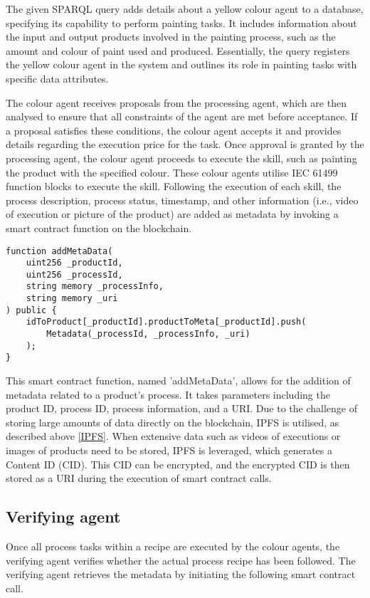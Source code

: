 \documentclass[conference]{IEEEtran}
\begin{document}
The given SPARQL query adds details about a yellow colour agent to a database, specifying its capability to perform painting tasks. It includes information about the input and output products involved in the painting process, such as the amount and colour of paint used and produced. Essentially, the query registers the yellow colour agent in the system and outlines its role in painting tasks with specific data attributes.

The colour agent receives proposals from the processing agent, which are then analysed to ensure that all constraints of the agent are met before acceptance.  If a proposal satisfies these conditions, the colour agent accepts it and provides details regarding the execution price for the task. Once approval is granted by the processing agent, the colour agent proceeds to execute the skill,  such as painting the product with the specified colour. These colour agents utilise IEC 61499 function blocks to execute the skill. Following the execution of each skill, the process description, process status, timestamp, and other information (i.e., video of execution or picture of the product) are added as metadata by invoking a smart contract function on the blockchain.

\begin{lstlisting} 
function addMetaData(
    uint256 _productId,
    uint256 _processId,
    string memory _processInfo,
    string memory _uri
) public {
    idToProduct[_productId].productToMeta[_productId].push(
        Metadata(_processId, _processInfo, _uri)
    );
}
\end{lstlisting}

This smart contract function, named 'addMetaData', allows for the addition of metadata related to a product's process. It takes parameters including the product ID, process ID, process information, and a URI. Due to the challenge of storing large amounts of data directly on the blockchain, IPFS is utilised, as described above \ref{IPFS}. When extensive data such as videos of executions or images of products need to be stored, IPFS is leveraged, which generates a Content ID (CID). This CID can be encrypted, and the encrypted CID is then stored as a URI during the execution of smart contract calls.

\subsection{Verifying agent} 

Once all process tasks within a recipe are executed by the colour agents, the verifying agent verifies whether the actual process recipe has been followed. The verifying agent retrieves the metadata by initiating the following smart contract call.
\end{document}
